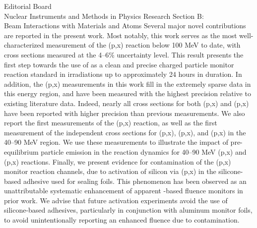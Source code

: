 \documentclass{letter} %
\begin{document}
\begin{letter}{Editorial Board \\
Nuclear Instruments and Methods in Physics Research Section B: \\
Beam Interactions with Materials and Atoms}
\noindent Several major novel contributions are reported in the present work. Most notably, this work serves as the most well-characterized measurement of the (p,x) reaction below 100 MeV to date, with cross sections measured  at the 4--6\% uncertainty level. 
This result presents the first step towards the use of  as a clean and precise   charged particle monitor reaction standard in irradiations up to approximately 24 hours in duration.
In addition, the (p,x) measurements in this work fill in the extremely sparse data in this energy region, and have been measured with the highest precision relative to existing literature data. 
Indeed, nearly all cross sections for both (p,x) and (p,x) have been reported with higher precision than previous measurements.
We also report the first measurements of the  (p,x) reaction, as well as the first measurement of the independent cross sections for    (p,x), (p,x), and (p,x) in the 40--90 MeV region.
We  use these measurements to illustrate the impact of pre-equilibrium particle emission in the reaction dynamics for 40--90 MeV (p,x) and  (p,x) reactions.
Finally, we present evidence for  contamination of the (p,x) monitor reaction channels, due to activation of silicon via (p,x)  in the silicone-based adhesive used for sealing foils.
This phenomenon has been observed as an unattributable systematic enhancement of apparent -based fluence monitors in prior work. 
We advise that future activation experiments avoid the use of silicone-based adhesives, particularly in conjunction with aluminum monitor foils, to avoid unintentionally reporting an enhanced fluence due to  contamination.







\end{letter}
\end{document}
